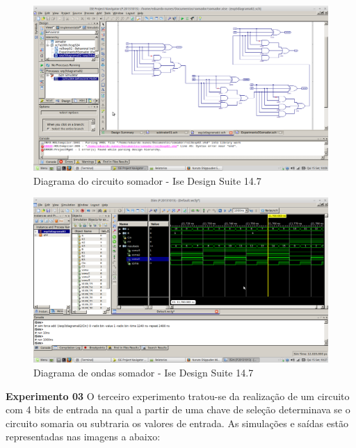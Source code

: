 \documentclass[12pts]{article}
\begin{document}
\begin{figure}[!htb]
  \centering
  \includegraphics[scale=0.2]{img/somadorDefinitivo.png}
  \caption{Diagrama do circuito somador - Ise Design Suite 14.7}
  \label{figRotulo}
\end{figure}

\begin{figure}[!htb]
  \centering
  \includegraphics[scale=0.2]{img/saidaSomador}
  \caption{Diagrama de ondas somador - Ise Design Suite 14.7}
  \label{figRotulo}
\end{figure}

\newpage

\textbf{Experimento 03}
\singlespacing
O terceiro experimento tratou-se da realização de um circuito com 4 bits de entrada na qual a partir de uma chave de seleção determinava se o circuito somaria ou subtraria os valores de entrada. As simulações e saídas estão representadas nas imagens a abaixo:
\end{document}
